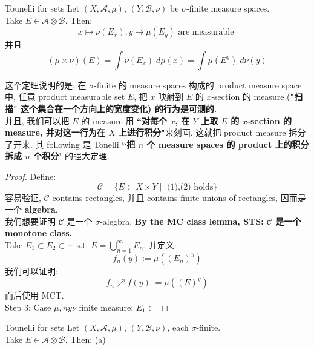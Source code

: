\documentclass[lang=cn,11pt]{elegantbook}
\begin{document}
\begin{theorem}{Tounelli for sets}
Let $(X,\mathcal{A}, \mu)$, $(Y, \mathcal{B}, \nu)$ be $\sigma$-finite measure spaces.\\
Take $E \in \mathcal{A} \otimes \mathcal{B}$. Then:  \[
x \mapsto \nu(E_x), y \mapsto \mu(E_y) \text{ are measurable }
\] 并且 \[
(\mu \times \nu)(E) = \int \nu(E_x)  \; d\mu(x) = \int \mu(E^y) \; d \nu(y)
\]
\end{theorem}
\begin{remark}
这个定理说明的是: 在 $\sigma$-finite 的 measure spaces 构成的 product measure space 中, 任意 product measurable set $E$, 把 $x$ 映射到 $E$ 的 $x$-section 的 measure (\textbf{"扫描" 这个集合在一个方向上的宽度变化) 的行为是可测的.}\\
并且, 我们可以把 $E$ 的 measure 用 \textbf{``对每个 $x$, 在 $Y$ 上取 $E$ 的 $x$-section 的 measure, 并对这一行为在 $X$ 上进行积分"}来刻画. 这就把 product measure 拆分了开来. 其 following 是 Tonelli \textbf{``把 $n$ 个 measure spaces 的 product 上的积分拆成 $n$ 个积分}" 的强大定理.

\end{remark}
\begin{proof}
Define:    $$\mathcal{C} = \{ E \subset X \times Y \mid \text{ (1),(2) holds}\}$$
容易验证, $\mathcal{C}$ contains rectangles, 并且 contains finite unions of rectangles, 因而是一个 \textbf{algebra}.\\
我们想要证明 $\mathcal{C}$ 是一个 $\sigma$-alegbra. \textbf{By the MC class lemma, STS: $\mathcal{C}$ 是一个 monotone class.}\\
Take $E_1 \subset E_2 \subset \cdots $ s.t. $E = \bigcup_{n=1}^\infty E_n$. 并定义: \[f_n(y) := \mu((E_n)^y)\]
我们可以证明: \[f_n \nearrow f(y) := \mu((E)^y)\] 而后使用 MCT.\\
Step 3: Case $\mu,ny\nu$ finite measure: $E_1 \subset$
\end{proof}




\begin{theorem}{Tounelli for sets}
 Let $(X,\mathcal{A}, \mu)$, $(Y, \mathcal{B}, \nu)$, each $\sigma$-finite.\\
Take $E \in \mathcal{A} \otimes \mathcal{B}$. Then: 
(a) 
\end{theorem}
\end{document}
